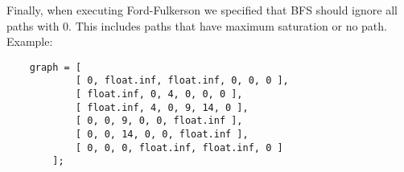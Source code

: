 \documentclass{article}
\begin{document}
  \noindent Finally, when executing Ford-Fulkerson we specified that BFS should ignore all paths with 0. This includes paths that have maximum saturation or no path.  \vspace{5mm} %
  Example:
  \begin{verbatim}
    graph = [ 
            [ 0, float.inf, float.inf, 0, 0, 0 ],
            [ float.inf, 0, 4, 0, 0, 0 ],
            [ float.inf, 4, 0, 9, 14, 0 ], 
            [ 0, 0, 9, 0, 0, float.inf ],
            [ 0, 0, 14, 0, 0, float.inf ],  
            [ 0, 0, 0, float.inf, float.inf, 0 ]
        ];
  \end{verbatim}
\end{document}
